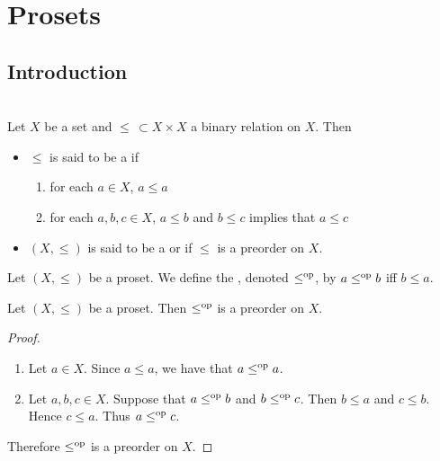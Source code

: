 \documentclass{book}
\begin{document}
	\section{Prosets}
	
	\subsection{Introduction}
	
	\begin{defn}   \\
		Let $X$ be a set and $\leq \, \subset X \times X$ a binary relation on $X$. Then 
		\begin{itemize}
			\item $\leq$ is said to be a  if
			\begin{enumerate}
				\item for each $a \in X$, $a \leq a$
				\item for each $a, b, c \in X$, $a \leq b$ and $b \leq c$ implies that $a \leq c$
			\end{enumerate}
			\item $(X, \leq)$ is said to be a  or  if $\leq$ is a preorder on $X$.
		\end{itemize}
	\end{defn}
	
	\begin{defn} 
		Let $(X, \leq)$ be a proset. We define the , denoted $\leq^{\text{op}}$, by $a \leq^{\text{op}} b$ iff $b \leq a$.
	\end{defn}
	
	\begin{ex} 
		Let $(X, \leq)$ be a proset. Then $\leq^{\text{op}}$ is a preorder on $X$.
	\end{ex}
	
	\begin{proof}\
		\begin{enumerate}
			\item Let $a \in X$. Since $a \leq a$, we have that $a \leq^{\text{op}} a$. 
			\item Let $a,b,c \in X$. Suppose that $a \leq^{\text{op}} b$ and $b \leq^{\text{op}} c$. Then $b \leq a$ and $c \leq b$. Hence $c \leq a$. Thus $a \leq^{\text{op}} c$. 
		\end{enumerate}
		Therefore $\leq^{\text{op}}$ is a preorder on $X$. 
	\end{proof}
	
\end{document}
